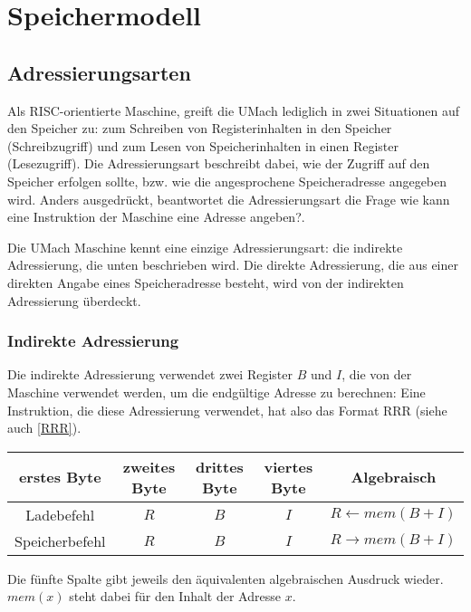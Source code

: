 \section{Speichermodell}

\subsection{Adressierungsarten}
\label{subsec:Adressierungsarten}

Als RISC-orientierte Maschine, greift die UMach lediglich in zwei Situationen
auf den Speicher zu: zum Schreiben von Registerinhalten in den Speicher
(Schreibzugriff) und zum Lesen von Speicherinhalten in einen Register
(Lesezugriff).  Die \gls{Adressierungsart} beschreibt dabei, wie der Zugriff
auf den Speicher erfolgen sollte, bzw. wie die angesprochene Speicheradresse
angegeben wird. Anders ausgedrückt, beantwortet die Adressierungsart die Frage
\glqq wie kann eine Instruktion der Maschine eine Adresse angeben?\grqq. 

Die UMach Maschine kennt eine einzige Adressierungsart: die indirekte
Adressierung, die unten beschrieben wird. Die direkte Adressierung, die aus
einer direkten Angabe eines Speicheradresse besteht, wird von der indirekten
Adressierung überdeckt.

\subsubsection{Indirekte Adressierung}

Die indirekte Adressierung verwendet zwei Register $B$ und $I$, die
von der Maschine verwendet werden, um die endgültige Adresse zu berechnen:
Eine Instruktion, die diese Adressierung verwendet, hat also das Format RRR
(siehe auch \ref{RRR}).
\begin{center}
  \begin{tabular}{|*{4}{c|}|c|} \hline
    erstes Byte    & zweites Byte  & drittes Byte  & viertes Byte & Algebraisch
\\\hline\hline
    Ladebefehl     & $R$  & $B$  & $I$  & $R \gets mem(B + I)$ \\\hline
    Speicherbefehl & $R$  & $B$  & $I$  & $R \to   mem(B + I)$ \\\hline
  \end{tabular}
\end{center}
Die fünfte Spalte gibt jeweils den äquivalenten algebraischen Ausdruck wieder.
$mem(x)$ steht dabei für den Inhalt der Adresse $x$.



